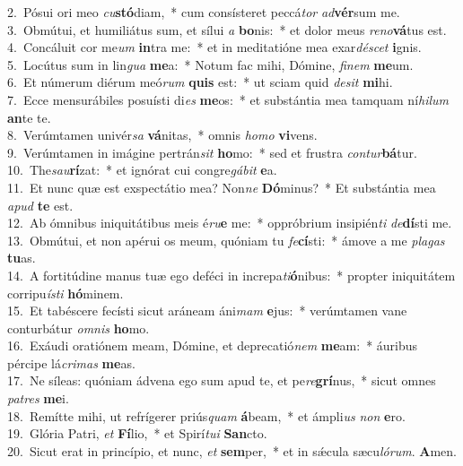 {2.~}Pósui ori meo \textit{cu}\textbf{stó}diam,~* cum consísteret peccá\textit{tor} \textit{ad}\textbf{vér}sum me.\\
{3.~}Obmútui, et humiliátus sum, et sílui \textit{a} \textbf{bo}nis:~* et dolor meus \textit{re}\textit{no}\textbf{vá}tus est.\\
{4.~}Concáluit cor me\textit{um} \textbf{in}tra me:~* et in meditatióne mea exar\textit{dé}\textit{scet} \textbf{i}gnis.\\
{5.~}Locútus sum in lin\textit{gua} \textbf{me}a:~* Notum fac mihi, Dómine, \textit{fi}\textit{nem} \textbf{me}um.\\
{6.~}Et númerum diérum meó\textit{rum} \textbf{quis} est:~* ut sciam quid \textit{de}\textit{sit} \textbf{mi}hi.\\
{7.~}Ecce mensurábiles posuísti di\textit{es} \textbf{me}os:~* et substántia mea tamquam ní\textit{hi}\textit{lum} \textbf{an}te te.\\
{8.~}Verúmtamen univér\textit{sa} \textbf{vá}nitas,~* omnis \textit{ho}\textit{mo} \textbf{vi}vens.\\
{9.~}Verúmtamen in imágine pertrán\textit{sit} \textbf{ho}mo:~* sed et frustra \textit{con}\textit{tur}\textbf{bá}tur.\\
{10.~}The\textit{sau}\textbf{rí}zat:~* et ignórat cui congre\textit{gá}\textit{bit} \textbf{e}a.\\
{11.~}Et nunc quæ est exspectátio mea? Non\textit{ne} \textbf{Dó}minus?~* Et substántia mea \textit{a}\textit{pud} \textbf{te} est.\\
{12.~}Ab ómnibus iniquitátibus meis é\textit{ru}\textbf{e} me:~* oppróbrium insipién\textit{ti} \textit{de}\textbf{dí}sti me.\\
{13.~}Obmútui, et non apérui os meum, quóniam tu \textit{fe}\textbf{cí}sti:~* ámove a me \textit{pla}\textit{gas} \textbf{tu}as.\\
{14.~}A fortitúdine manus tuæ ego deféci in increpa\textit{ti}\textbf{ó}nibus:~* propter iniquitátem corripu\textit{í}\textit{sti} \textbf{hó}minem.\\
{15.~}Et tabéscere fecísti sicut aráneam áni\textit{mam} \textbf{e}jus:~* verúmtamen vane conturbátur \textit{om}\textit{nis} \textbf{ho}mo.\\
{16.~}Exáudi oratiónem meam, Dómine, et deprecatió\textit{nem} \textbf{me}am:~* áuribus pércipe lá\textit{cri}\textit{mas} \textbf{me}as.\\
{17.~}Ne síleas: quóniam ádvena ego sum apud te, et pe\textit{re}\textbf{grí}nus,~* sicut omnes \textit{pa}\textit{tres} \textbf{me}i.\\
{18.~}Remítte mihi, ut refrígerer priús\textit{quam} \textbf{á}beam,~* et ámpli\textit{us} \textit{non} \textbf{e}ro.\\
{19.~}Glória Patri, \textit{et} \textbf{Fí}lio,~* et Spirí\textit{tu}\textit{i} \textbf{San}cto.\\
{20.~}Sicut erat in princípio, et nunc, \textit{et} \textbf{sem}per,~* et in sǽcula sæcu\textit{ló}\textit{rum}. \textbf{A}men.\\
